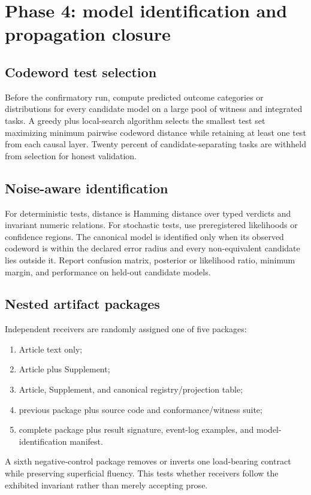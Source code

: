 \documentclass[11pt]{article}
\begin{document}
\section{Phase 4: model identification and propagation closure}

\subsection{Codeword test selection}

Before the confirmatory run, compute predicted outcome categories or distributions for every candidate model on a large pool of witness and integrated tasks. A greedy plus local-search algorithm selects the smallest test set maximizing minimum pairwise codeword distance while retaining at least one test from each causal layer. Twenty percent of candidate-separating tasks are withheld from selection for honest validation.

\subsection{Noise-aware identification}

For deterministic tests, distance is Hamming distance over typed verdicts and invariant numeric relations. For stochastic tests, use preregistered likelihoods or confidence regions. The canonical model is identified only when its observed codeword is within the declared error radius and every non-equivalent candidate lies outside it. Report confusion matrix, posterior or likelihood ratio, minimum margin, and performance on held-out candidate models.

\subsection{Nested artifact packages}

Independent receivers are randomly assigned one of five packages:
\begin{enumerate}
\item Article text only;
\item Article plus Supplement;
\item Article, Supplement, and canonical registry/projection table;
\item previous package plus source code and conformance/witness suite;
\item complete package plus result signature, event-log examples, and model-identification manifest.
\end{enumerate}
A sixth negative-control package removes or inverts one load-bearing contract while preserving superficial fluency. This tests whether receivers follow the exhibited invariant rather than merely accepting prose.
\end{document}
